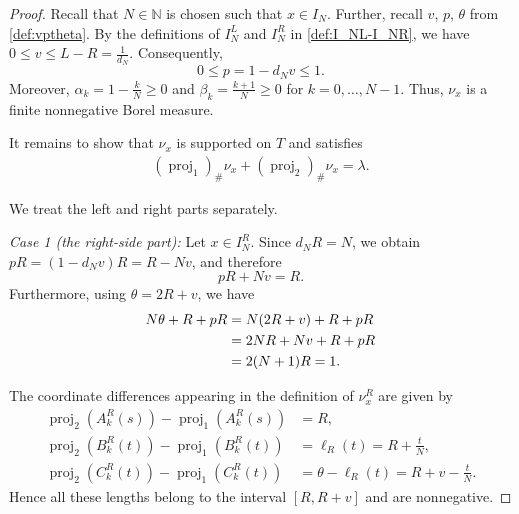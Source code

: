 \documentclass{article}
\newcommand{\lam}{\lambda}
\begin{document}
\begin{proof}
Recall that \(N\in\mathbb N\) is chosen such that \(x\in I_N\).
Further, recall \(v\), \(p\), \(\theta\) from \eqref{def:vptheta}.
By the definitions of \(I_N^L\) and \(I_N^R\) in \eqref{def:I_NL-I_NR}, we have \(0\leq v\leq L-R=\frac1{d_N}\).
Consequently,
\[
    0\leq p=1-d_Nv\leq1.
\]
Moreover, \(\alpha_k=1-\frac{k}{N}\geq 0\) and \(\beta_k=\frac{k+1}{N}\geq 0 \) for \(k=0,\ldots,N-1\).
Thus, \(\nu_x\) is a finite nonnegative Borel measure.

It remains to show that \(\nu_x\) is supported on \(T\) and satisfies
\begin{align}\label{prop_proj_nu_x}
    (\operatorname{proj}_1)_\#\nu_x
    +
    (\operatorname{proj}_2)_\#\nu_x
    =
    \lam.
\end{align}

We treat the left and right parts separately.

\medskip
\noindent

\emph{Case 1 (the right-side part): } Let \(x\in I_N^R\).
Since \(d_NR=N\), we obtain \(pR=(1-d_Nv)R=R-Nv\), and therefore
\begin{equation}\label{eq:right-identities-proof}
    pR+Nv=R.
\end{equation}
Furthermore, using \(\theta=2R+v\), we have
\begin{align}
    N\theta+R+pR
    &=
    N(2R+v)+R+pR \notag\\
    &=
    2NR+Nv+R+pR \notag\\
    &=
    2(N+1)R
    =1.
    \label{eq:right-closure-proof}
\end{align}

The coordinate differences appearing in the definition of \(\nu_x^R\) are given by
\[
\begin{aligned}
    \operatorname{proj}_2(A_k^R(s))
    -
    \operatorname{proj}_1(A_k^R(s))
    &=R,\\
    \operatorname{proj}_2(B_k^R(t))
    -
    \operatorname{proj}_1(B_k^R(t))
    &=\ell_R(t)
      =R+\frac{t}{N},\\
    \operatorname{proj}_2(C_k^R(t))
    -
    \operatorname{proj}_1(C_k^R(t))
    &=\theta-\ell_R(t)
      =R+v-\frac{t}{N}.
\end{aligned}
\]
Hence all these lengths belong to the interval \([R,R+v]\) and are nonnegative.


\end{proof}
\end{document}
